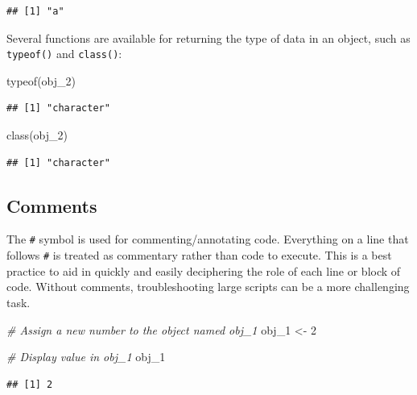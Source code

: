 \documentclass[
]{book}
\newenvironment{Shaded}{\begin{snugshade}}{\end{snugshade}}
\newcommand{\CommentTok}[1]{\textcolor[rgb]{0.56,0.35,0.01}{\textit{#1}}}
\newcommand{\DecValTok}[1]{\textcolor[rgb]{0.00,0.00,0.81}{#1}}
\newcommand{\FunctionTok}[1]{\textcolor[rgb]{0.00,0.00,0.00}{#1}}
\newcommand{\NormalTok}[1]{#1}
\newcommand{\OtherTok}[1]{\textcolor[rgb]{0.56,0.35,0.01}{#1}}
\begin{document}
\begin{verbatim}
## [1] "a"
\end{verbatim}

Several functions are available for returning the type of data in an object, such as \texttt{typeof()} and \texttt{class()}:

\begin{Shaded}
\begin{Highlighting}[]
\FunctionTok{typeof}\NormalTok{(obj\_2)}
\end{Highlighting}
\end{Shaded}

\begin{verbatim}
## [1] "character"
\end{verbatim}

\begin{Shaded}
\begin{Highlighting}[]
\FunctionTok{class}\NormalTok{(obj\_2)}
\end{Highlighting}
\end{Shaded}

\begin{verbatim}
## [1] "character"
\end{verbatim}

\hypertarget{comments}{%
\subsection{Comments}\label{comments}}

The \texttt{\#} symbol is used for commenting/annotating code. Everything on a line that follows \texttt{\#} is treated as commentary rather than code to execute. This is a best practice to aid in quickly and easily deciphering the role of each line or block of code. Without comments, troubleshooting large scripts can be a more challenging task.

\begin{Shaded}
\begin{Highlighting}[]
\CommentTok{\# Assign a new number to the object named obj\_1}
\NormalTok{obj\_1 }\OtherTok{\textless{}{-}} \DecValTok{2}

\CommentTok{\# Display value in obj\_1}
\NormalTok{obj\_1}
\end{Highlighting}
\end{Shaded}

\begin{verbatim}
## [1] 2
\end{verbatim}
\end{document}
